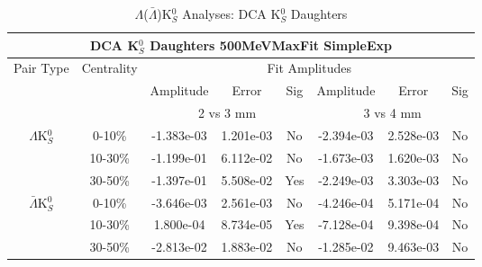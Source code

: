 \documentclass[../AnalysisNoteJBuxton.tex]{subfiles}
\begin{document}
\begin{table}
 \centering
 \begin{tabular}{|c|c|c|c|c||c|c|c|}
  \multicolumn{8}{c}{DCA K$^{0}_{S}$ Daughters 500MeVMaxFit SimpleExp} \\
  \hline
  \multirow{3}{*}{Pair Type} & \multirow{3}{*}{Centrality} & \multicolumn{6}{c|}{Fit Amplitudes} \\
  \cline{3-8}
   & & Amplitude & Error & Sig & Amplitude & Error & Sig \\  
  \cline{3-8}
   & & \multicolumn{3}{c||}{2 vs 3 mm} & \multicolumn{3}{c|}{3 vs 4 mm} \\  
  \hline  
  \multirow{3}{*}{$\Lambda$K$^{0}_{S}$}  
   &  0-10\% & -1.383e-03 & 1.201e-03 & No & -2.394e-03 & 2.528e-03 & No \\
   & 10-30\% & -1.199e-01 & 6.112e-02 & No & -1.673e-03 & 1.620e-03 & No \\
   & 30-50\% & -1.397e-01 & 5.508e-02 & Yes & -2.249e-03 & 3.303e-03 & No \\
  \hline  
  \multirow{3}{*}{$\bar{\Lambda}$K$^{0}_{S}$}  
   &  0-10\% & -3.646e-03 & 2.561e-03 & No & -4.246e-04 & 5.171e-04 & No \\
   & 10-30\% & 1.800e-04 & 8.734e-05 & Yes & -7.128e-04 & 9.398e-04 & No \\
   & 30-50\% & -2.813e-02 & 1.883e-02 & No & -1.285e-02 & 9.463e-03 & No \\
  \hline
 \end{tabular}
 \caption{$\Lambda$($\bar{\Lambda}$)K$^{0}_{S}$ Analyses: DCA K$^{0}_{S}$ Daughters}
 \label{tab:K0DaughtersDcaLamK0_500MeVMaxFit_SimpleExp}
\end{table}




\clearpage
\end{document}
